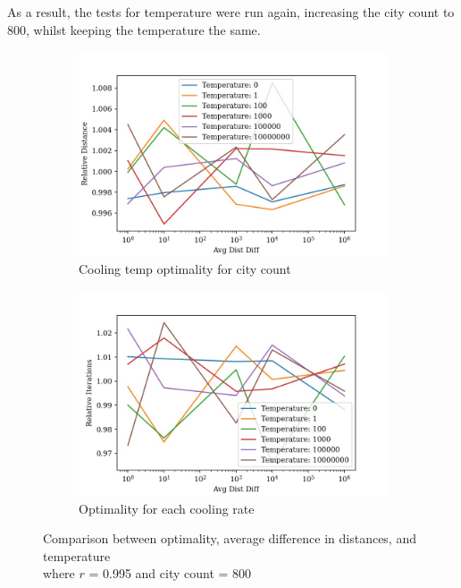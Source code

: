 \documentclass{article}
\begin{document}
As a result, the tests for temperature were run again, increasing the city count to 800, whilst keeping the temperature the same.

\begin{figure}[H]
    \centering
    \begin{subfigure}{0.5\textwidth}
        \centering
        \includegraphics[width=1\linewidth]{images/rand_temperature_avg_dist_diff_distance_relative_800.jpg}
        \caption{Cooling temp optimality for city count}
        \label{fig:sub1}
    \end{subfigure}%
    \begin{subfigure}{0.5\textwidth}
        \centering
        \includegraphics[width=1\linewidth]{images/rand_temperature_avg_dist_diff_iterations_relative_800.jpg}
        \caption{Optimality for each cooling rate}
        \label{fig:sub2}
    \end{subfigure}
    \captionsetup{justification=centering}
    \caption{Comparison between optimality, average difference in distances, and temperature \\ where $r$ = 0.995 and city count = 800}
\end{figure}
\end{document}
